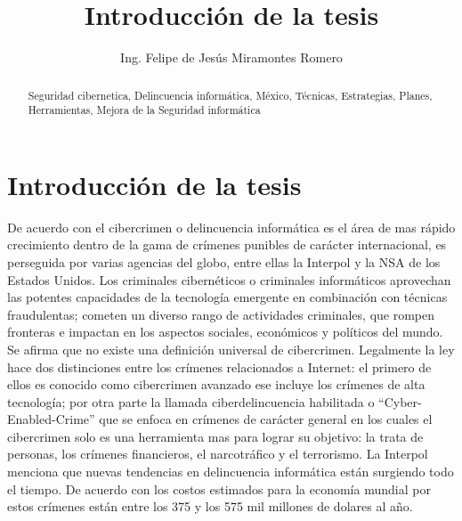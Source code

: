 \documentclass[runningheads,a4paper]{llncs}
\newcommand{\keywords}[1]{\par\addvspace\baselineskip
\noindent\keywordname\enspace\ignorespaces#1}
\begin{document}
\mainmatter  
\title{Introducción de la tesis}
\author{Ing. Felipe de Jesús Miramontes Romero}
\maketitle


\begin{abstract}
\keywords{Seguridad cibernetica, Delincuencia informática, México, Técnicas, Estrategias, Planes, Herramientas, Mejora de la Seguridad informática}
\end{abstract}


\section{Introducción de la tesis}
De acuerdo con \cite{Interpol_1} el cibercrimen o delincuencia informática es el área de mas rápido crecimiento dentro de la gama de crímenes punibles de carácter internacional, es perseguida por varias agencias del globo, entre ellas la Interpol y la \gls{NSA} de los Estados Unidos. Los criminales cibernéticos o criminales informáticos aprovechan las potentes capacidades de la tecnología emergente en combinación con técnicas fraudulentas; cometen un diverso rango de actividades criminales, que rompen fronteras e impactan en los aspectos sociales, económicos y políticos del mundo. Se afirma que no existe una definición universal de cibercrimen. Legalmente la ley hace dos distinciones entre los crímenes relacionados a Internet: el primero de ellos es conocido como cibercrimen avanzado ese incluye los crímenes de alta tecnología; por otra parte la llamada ciberdelincuencia habilitada o ``Cyber-Enabled-Crime'' que se enfoca en crímenes de carácter general en los cuales el cibercrimen solo es una herramienta mas para lograr su objetivo: la trata de personas, los crímenes financieros, el narcotráfico y el terrorismo. La Interpol menciona que nuevas tendencias en delincuencia informática están surgiendo todo el tiempo. De acuerdo con \cite{Forbes_1} los costos estimados para la economía mundial por estos crímenes están entre los 375 y los 575 mil millones de dolares al año.\\
\end{document}
